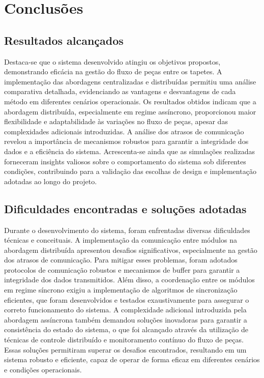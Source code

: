 \section{Conclusões}

\subsection{Resultados alcançados}

Destaca-se que o sistema desenvolvido atingiu os objetivos propostos, demonstrando eficácia na gestão do fluxo de peças entre os tapetes. A implementação das abordagens centralizadas e distribuídas permitiu uma análise comparativa detalhada, evidenciando as vantagens e desvantagens de cada método em diferentes cenários operacionais. Os resultados obtidos indicam que a abordagem distribuída, especialmente em regime assíncrono, proporcionou maior flexibilidade e adaptabilidade às variações no fluxo de peças, apesar das complexidades adicionais introduzidas. A análise dos atrasos de comunicação revelou a importância de mecanismos robustos para garantir a integridade dos dados e a eficiência do sistema. Acrescenta-se ainda que as simulações realizadas forneceram insights valiosos sobre o comportamento do sistema sob diferentes condições, contribuindo para a validação das escolhas de design e implementação adotadas ao longo do projeto.

\subsection{Dificuldades encontradas e soluções adotadas}

Durante o desenvolvimento do sistema, foram enfrentadas diversas dificuldades técnicas e conceituais. A implementação da comunicação entre módulos na abordagem distribuída apresentou desafios significativos, especialmente na gestão dos atrasos de comunicação. Para mitigar esses problemas, foram adotados protocolos de comunicação robustos e mecanismos de buffer para garantir a integridade dos dados transmitidos. Além disso, a coordenação entre os módulos em regime síncrono exigiu a implementação de algoritmos de sincronização eficientes, que foram desenvolvidos e testados exaustivamente para assegurar o correto funcionamento do sistema. A complexidade adicional introduzida pela abordagem assíncrona também demandou soluções inovadoras para garantir a consistência do estado do sistema, o que foi alcançado através da utilização de técnicas de controle distribuído e monitoramento contínuo do fluxo de peças. Essas soluções permitiram superar os desafios encontrados, resultando em um sistema robusto e eficiente, capaz de operar de forma eficaz em diferentes cenários e condições operacionais.